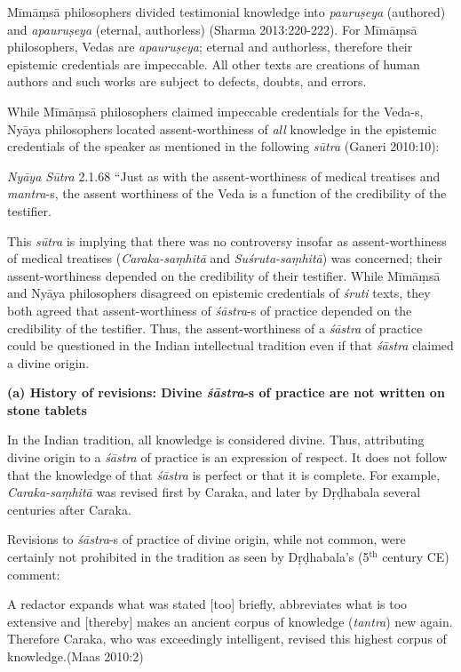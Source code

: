 Mīmāṃsā philosophers divided testimonial knowledge into {\sl pauruṣeya} (authored) and {\sl apauruṣeya} (eternal, authorless) (Sharma 2013:220-222). For Mīmāṃsā philosophers, Vedas are {\sl apauruṣeya}; eternal and authorless, therefore their epistemic credentials are impeccable. All other texts are creations of human authors and such works are subject to defects, doubts, and errors.

While Mīmāṃsā philosophers claimed impeccable credentials for the Veda-s, Nyāya philosophers located assent-worthiness of {\sl all} knowledge in the epistemic credentials of the speaker as mentioned in the following {\sl sūtra} (Ganeri 2010:10):
\begin{myquote}
{{\sl Nyāya Sūtra}\relax}  2.1.68 ``Just as with the assent-worthiness of medical treatises and {\sl mantra}-s, the assent worthiness of the Veda is a function of the credibility of the testifier.
\end{myquote}

This {\sl sūtra} is implying that there was no controversy insofar as assent-worthiness of medical treatises ({\sl Caraka-saṃhitā} and {\sl Suśruta-saṃhitā}) was concerned; their assent-worthiness depended on the credibility of their testifier. While Mīmāṃsā and Nyāya philosophers disagreed on epistemic credentials of {\sl śruti} texts, they both agreed that assent-worthiness of {\sl śāstra}-s of practice depended on the credibility of the testifier. Thus, the assent-worthiness of a {\sl śāstra} of practice could be questioned in the Indian intellectual tradition even if that {\sl śāstra} claimed a divine origin.

{\bf (a) History of revisions: Divine {\sl\bfseries śāstra}-s of practice are not written on stone tablets}

In the Indian tradition, all knowledge is considered divine.  Thus, attributing divine origin to a {\sl śāstra} of practice is an expression of respect.  It does not follow that the knowledge of that {\sl śāstra} is perfect or that it is complete.  For example, {\sl Caraka-saṃhitā} was revised first by Caraka, and later by Dṛḍhabala several centuries after Caraka.

Revisions to {\sl śāstra}-s of practice of divine origin, while not common, were certainly not prohibited in the tradition as seen by Dṛḍhabala's (5$^{\text{th}}$ century CE) comment:
\begin{myquote}
A redactor expands what was stated [too] briefly, abbreviates what is too extensive and [thereby] makes an ancient corpus of knowledge ({\sl tantra}) new again. Therefore Caraka, who was exceedingly intelligent, revised this highest corpus of knowledge.\hfill (Maas 2010:2)
\end{myquote}

